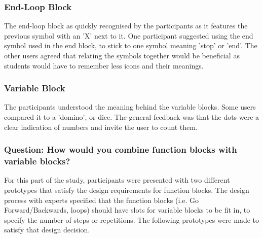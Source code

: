\documentclass[oneside,%
                    author={Malak Hajji},
                    degree={BSc},
                    title={Designing An Accessible Computational Toolkit For Students},
                  subtitle={With Mixed Visual Abilities}]{dissertation}
\begin{document}
\subsubsection{End-Loop Block}
The end-loop block as quickly recognised by the participants as it features the previous symbol with an 'X' next to it. One participant suggested using the end symbol used in the end block, to stick to one symbol meaning 'stop' or 'end'. The other users agreed that relating the symbols together would be beneficial as students would have to remember less icons and their meanings.

\subsubsection{Variable Block}
The participants understood the meaning behind the variable blocks. Some users compared it to a 'domino', or dice. The general feedback was that the dots were a clear indication of numbers and invite the user to count them.

\subsubsection{Question: How would you combine function blocks with variable blocks?}
For this part of the study, participants were presented with two different prototypes that satisfy the design requirements for function blocks. The design process with experts specified that the function blocks (i.e. Go Forward/Backwards, loops) should have slots for variable blocks to be fit in, to specify the number of steps or repetitions. The following prototypes were made to satisfy that design decision.
\end{document}
